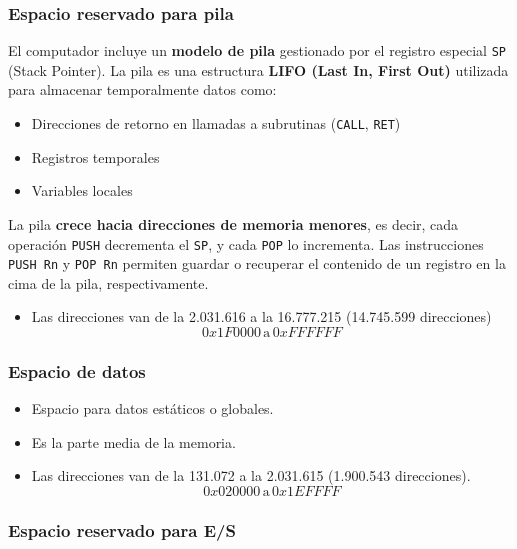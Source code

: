 \documentclass{article}
\begin{document}
\subsubsection{Espacio reservado para pila}

El computador incluye un \textbf{modelo de pila} gestionado por el registro especial \texttt{SP} (Stack Pointer). La pila es una estructura \textbf{LIFO (Last In, First Out)} utilizada para almacenar temporalmente datos como:

\begin{itemize}
  \item Direcciones de retorno en llamadas a subrutinas (\texttt{CALL}, \texttt{RET})
  \item Registros temporales
  \item Variables locales
\end{itemize}

La pila \textbf{crece hacia direcciones de memoria menores}, es decir, cada operación \texttt{PUSH} decrementa el \texttt{SP}, y cada \texttt{POP} lo incrementa. Las instrucciones \texttt{PUSH Rn} y \texttt{POP Rn} permiten guardar o recuperar el contenido de un registro en la cima de la pila, respectivamente.

\begin{itemize}
  \item Las direcciones van de la 2.031.616 a la 16.777.215 (14.745.599 direcciones)
        \[
          0x1F0000 \, \text{a} \, 0xFFFFFF
        \]
\end{itemize}

\subsubsection{Espacio de datos}

\begin{itemize}
  \item Espacio para datos estáticos o globales.
  \item Es la parte media de la memoria.
  \item Las direcciones van de la 131.072 a la 2.031.615 (1.900.543 direcciones).
        \[
          0x020000 \, \text{a} \, 0x1EFFFF
        \]
\end{itemize}

\subsubsection{Espacio reservado para E/S}
\end{document}
